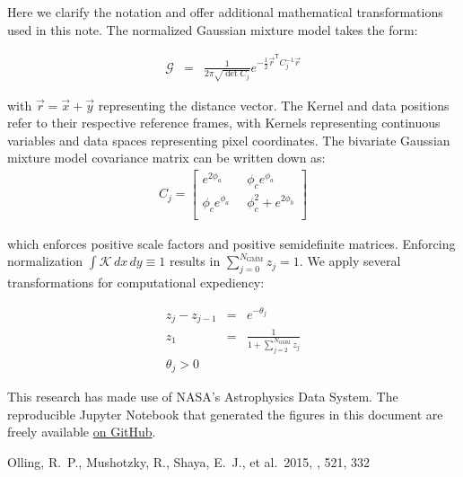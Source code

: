 \documentclass{rnaastex}
\newcommand{\trans}{\mathsf{T}}
\begin{document}
Here we clarify the notation and offer additional mathematical transformations used in this note.  The normalized Gaussian mixture model takes the form:

\begin{eqnarray}
\mathcal{G} &=& \frac{1}{2 \pi \sqrt{\det{C_j} }} e^{-\frac{1}{2} \vec{r}^{\trans} C_j^{-1} \vec{r}}
\end{eqnarray}

with $\vec{r}=\vec{x}+\vec{y}$ representing the distance vector.  The Kernel and data positions refer to their respective reference frames, with Kernels representing continuous variables and data spaces representing pixel coordinates.  The bivariate Gaussian mixture model covariance matrix can be written down as:
\begin{eqnarray}
   C_j=
  \left[ {\begin{array}{cc}
   e^{2 \phi_a} & \;\;\phi_c e^{\phi_a} \\
   \phi_c e^{\phi_a} & \;\;\phi_c^2 +e^{2\phi_b} \\
  \end{array} } \right]
\end{eqnarray}

which enforces positive scale factors and positive semidefinite matrices.  Enforcing normalization $\int \mathcal{K} \,dx\,dy \equiv 1$ results in $\sum_{j=0}^{N_{\mathrm{GMM}}} z_j = 1$.  We apply several transformations for computational expediency:

\begin{eqnarray}
z_j - z_{j-1} &=& e^{-\theta_j} \\
z_1 &=& \frac{1}{1 + \sum_{j=2}^{N_{\mathrm{GMM}}} z_j} \\
\theta_{j} >0
\end{eqnarray}


\acknowledgments

This research has made use of NASA's Astrophysics Data System.  The reproducible Jupyter Notebook that generated the figures in this document are freely available \href{https://github.com/gully/quigly}{on GitHub}.

\begin{thebibliography}{}

 Olling, R.~P., Mushotzky, R., Shaya, E.~J., et al.\ 2015, \nat, 521, 332

\end{thebibliography}
\end{document}
